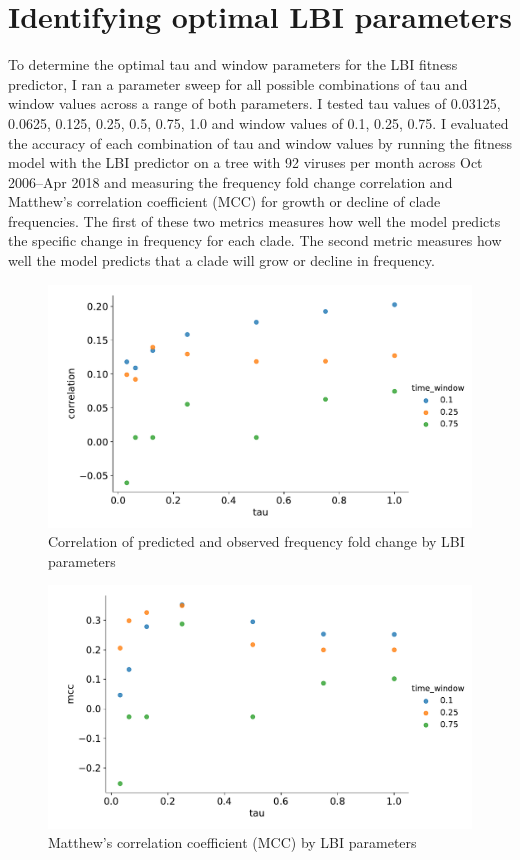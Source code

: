 \documentclass[12pt]{article}
\begin{document}
\section{Identifying optimal LBI parameters}

To determine the optimal tau and window parameters for the LBI fitness predictor, I ran a parameter sweep for all possible combinations of tau and window values across a range of both parameters.
I tested tau values of 0.03125, 0.0625, 0.125, 0.25, 0.5, 0.75, 1.0 and window values of 0.1, 0.25, 0.75.
I evaluated the accuracy of each combination of tau and window values by running the fitness model with the LBI predictor on a tree with 92 viruses per month across Oct 2006--Apr 2018 and measuring the frequency fold change correlation and Matthew's correlation coefficient (MCC) for growth or decline of clade frequencies.
The first of these two metrics measures how well the model predicts the specific change in frequency for each clade.
The second metric measures how well the model predicts that a clade will grow or decline in frequency.

\begin{figure}[h]
\includegraphics[width=5in]{frequency_correlation_by_lbi_parameters.pdf}
\caption{\label{fig:frequency-correlation-by-lbi-parameters}Correlation of predicted and observed frequency fold change by LBI parameters}
\end{figure}

\begin{figure}[h]
\includegraphics[width=5in]{mcc_by_lbi_parameters.pdf}
\caption{\label{fig:mcc-by-lbi-parameters}Matthew's correlation coefficient (MCC) by LBI parameters}
\end{figure}
\end{document}
